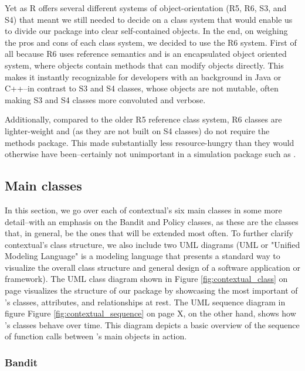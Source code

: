 \documentclass[nojss]{jss}\usepackage[]{graphicx}\usepackage[]{color}
\begin{document}
Yet as R offers several different systems of object-orientation (R5, R6, S3, and S4) that meant we still needed to decide on a class system that would enable us to divide our package into clear self-contained objects. In the end, on weighing the pros and cons of each class system, we decided to use the R6 system. First of all because R6 uses reference semantics and is an encapsulated object oriented system, where objects contain methods that can modify objects directly. This makes it instantly recognizable for developers with an background in Java or C++--in contrast to S3 and S4 classes, whose objects are not mutable, often making S3 and S4 classes more convoluted and verbose.

Additionally, compared to the older R5 reference class system, R6 classes are lighter-weight and (as they are not built on S4 classes) do not require the methods package. This made  substantially less resource-hungry than they would otherwise have been--certainly not unimportant in a simulation package such as .

\subsection{Main classes}

In this section, we go over each of contextual's six main classes in some more detail--with an emphasis on the Bandit and Policy classes, as these are the classes that, in general, be the ones that will be extended most often. To further clarify contextual's class structure, we also include two UML diagrams (UML or "Unified Modeling Language" is a modeling language that presents a standard way to visualize the overall class structure and general design of a software application or framework). The UML class diagram shown in Figure \ref{fig:contextual_class} on page \pageref{fig:contextual_class} visualizes the structure of our package by showcasing the most important of 's classes, attributes, and relationships at rest. The UML sequence diagram in figure Figure \ref{fig:contextual_sequence} on page \pageref{fig:contextual_sequence} X, on the other hand, shows how 's classes behave over time. This diagram depicts a basic overview of the sequence of function calls between 's main objects in action.

\subsubsection{Bandit}
\end{document}
